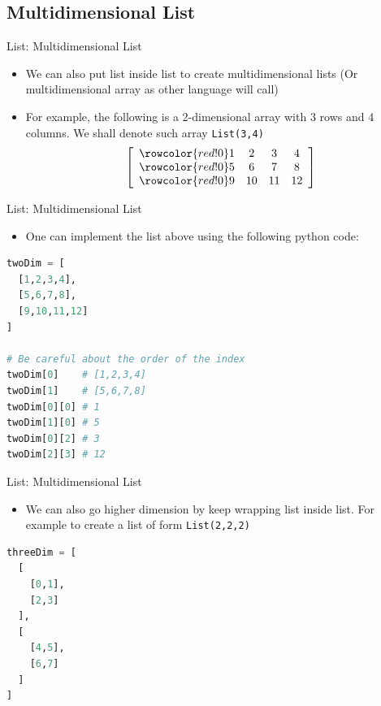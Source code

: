 \documentclass[10pt,xcolor={table,dvipsnames},t]{beamer}
\begin{document}
\subsection{Multidimensional List}
\begin{frame}[fragile]{List: Multidimensional List}
  \begin{itemize}
    \item We can also put list inside list to create multidimensional lists (Or multidimensional array as other language will call)
    \item For example, the following is a 2-dimensional array with $3$ rows and $4$ columns. We shall denote such array \texttt{List(3,4)}
    \begin{align*}
      \left[
      \begin{array}{cccc}
        \rowcolor{red!0}
        1 & 2 & 3 & 4 \\
        \rowcolor{red!0}
        5 & 6 & 7 & 8\\
        \rowcolor{red!0}
        9 & 10 & 11 & 12\\
      \end{array}
      \right]
    \end{align*}
  \end{itemize}
\end{frame}

\begin{frame}[fragile]{List: Multidimensional List}
  \begin{itemize}
    \item One can implement the list above using the following python code:
  \end{itemize}
\begin{lstlisting}[language=python]
twoDim = [
  [1,2,3,4],
  [5,6,7,8],
  [9,10,11,12]
]

# Be careful about the order of the index 
twoDim[0]    # [1,2,3,4]
twoDim[1]    # [5,6,7,8]
twoDim[0][0] # 1
twoDim[1][0] # 5
twoDim[0][2] # 3
twoDim[2][3] # 12
\end{lstlisting}
\end{frame}


\begin{frame}[fragile]{List: Multidimensional List}
  \begin{itemize}
    \item We can also go higher dimension by keep wrapping list inside list. For example to create a list of form \texttt{List(2,2,2)}
  \end{itemize}
\begin{lstlisting}[language=python]
threeDim = [
  [
    [0,1],
    [2,3]
  ],
  [
    [4,5],
    [6,7]
  ]
]
\end{lstlisting}
\end{frame}
\end{document}
